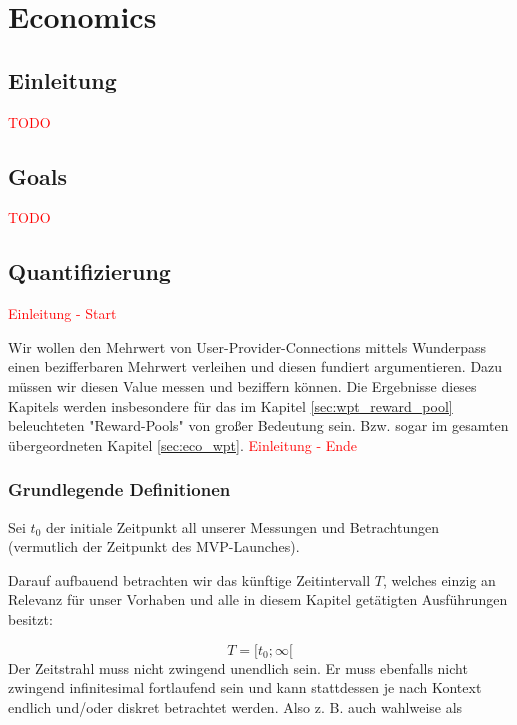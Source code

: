 \documentclass[11pt]{scrartcl}
\newcommand\todo[1]{\textcolor{red}{#1}}
\begin{document}
\section{Economics}
\label{sec:economics}


\subsection{Einleitung}
\label{sec:eco_einleitung}
\todo{TODO}



\subsection{Goals}
\label{sec:eco_goals}
\todo{TODO}



\subsection{Quantifizierung}
\label{sec:eco_zahlen}
\todo{Einleitung - Start}

Wir wollen den Mehrwert von User-Provider-Connections mittels Wunderpass einen bezifferbaren Mehrwert verleihen und diesen fundiert argumentieren. Dazu müssen wir diesen Value messen und beziffern können. Die Ergebnisse dieses Kapitels werden insbesondere für das im Kapitel \ref{sec:wpt_reward_pool} beleuchteten "Reward-Pools" von großer Bedeutung sein. Bzw. sogar im gesamten übergeordneten Kapitel \ref{sec:eco_wpt}.
\todo{Einleitung - Ende}

\subsubsection{Grundlegende Definitionen}
\label{sec:eco_zahlen_def}
Sei $t_0$ der initiale Zeitpunkt all unserer Messungen und Betrachtungen (vermutlich der Zeitpunkt des MVP-Launches).

Darauf aufbauend betrachten wir das künftige Zeitintervall $T$, welches einzig an Relevanz für unser Vorhaben und alle in diesem Kapitel getätigten Ausführungen besitzt:

\begin{equation*}
  T = [t_0; \infty[
\end{equation*}
Der Zeitstrahl muss nicht zwingend unendlich sein. Er muss ebenfalls nicht zwingend infinitesimal fortlaufend sein und kann stattdessen je nach Kontext endlich und/oder diskret betrachtet werden. Also z. B. auch wahlweise als 
\end{document}
